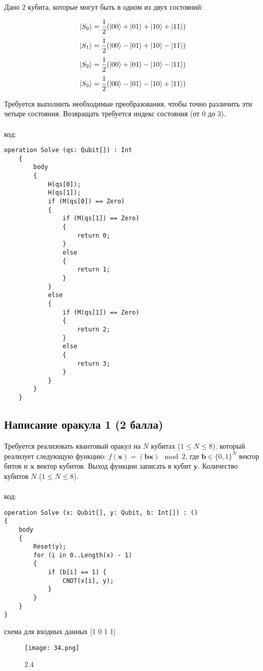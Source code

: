 \documentclass{article}
\begin{document}
Дано $2$ кубита, которые могут быть в одном из двух состояний:

$$\Ket{S_0} = \frac{1}{2}(\Ket{00} + \Ket{01} + \Ket{10} + \Ket{11})$$
$$\Ket{S_1} = \frac{1}{2}(\Ket{00} - \Ket{01} + \Ket{10} - \Ket{11})$$
$$\Ket{S_2} = \frac{1}{2}(\Ket{00} + \Ket{01} - \Ket{10} - \Ket{11})$$
$$\Ket{S_3} = \frac{1}{2}(\Ket{00} - \Ket{01} - \Ket{10} + \Ket{11})$$


Требуется выполнить необходимые преобразования, чтобы точно различить эти четыре состояния. Возвращать требуется индекс состояния (от $0$ до $3$). 
\\\\
код:
\begin{lstlisting}
operation Solve (qs: Qubit[]) : Int
    {
        body 
        {
			H(qs[0]);
			H(qs[1]);
			if (M(qs[0]) == Zero) 
			{
				if (M(qs[1]) == Zero)
				{
					return 0;
				}
				else
				{
					return 1;
				}
			}
			else
			{
				if (M(qs[1]) == Zero)
				{
					return 2;
				}
				else
				{
					return 3;
				}
			}
        }
    }

\end{lstlisting}


\subsection{Написание оракула 1 (2 балла)}

Требуется реализовать квантовый оракул на $N$ кубитах ($1 \le N \le 8$), который реализует следующую функцию: $f(\pmb{x}) = (\pmb{b}\pmb{x}) \mod 2$, где  $\pmb{b} \in \{0,1\}^N$ вектор битов и  $\pmb{x}$ вектор кубитов. Выход функции записать в кубит $\pmb{y}$. Количество кубитов $N$ ($1 \le N \le 8$). 
\\\\
код:
\begin{lstlisting}
operation Solve (x: Qubit[], y: Qubit, b: Int[]) : ()
{
    body 
    {
        Reset(y);
        for (i in 0..Length(x) - 1)
        {
            if (b[i] == 1) {
                CNOT(x[i], y);
            }
        }
    }
}

\end{lstlisting}

схема для входных данных [1 0 1 1]



\begin{figure}[h]
\centering
\caption{2.4}
\texttt{[image: 34.png]}

\end{figure}
\end{document}
